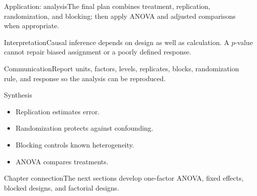 \documentclass[10pt,aspectratio=169]{beamer}
\begin{document}
\begin{frame}{Application: analysis}\small The final plan combines treatment, replication, randomization, and blocking; then apply ANOVA and adjusted comparisons when appropriate.\end{frame}
\begin{frame}{Interpretation}\small Causal inference depends on design as well as calculation. A $p$-value cannot repair biased assignment or a poorly defined response.\end{frame}
\begin{frame}{Communication}\small Report units, factors, levels, replicates, blocks, randomization rule, and response so the analysis can be reproduced.\end{frame}
\begin{frame}{Synthesis}\small\begin{itemize}\item Replication estimates error.\item Randomization protects against confounding.\item Blocking controls known heterogeneity.\item ANOVA compares treatments.\end{itemize}\end{frame}
\begin{frame}{Chapter connection}\small The next sections develop one-factor ANOVA, fixed effects, blocked designs, and factorial designs.\end{frame}
\end{document}
